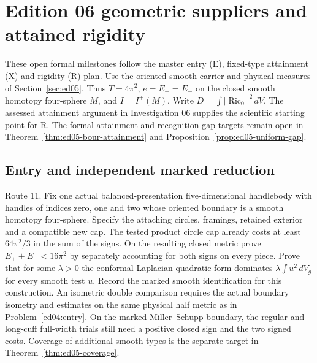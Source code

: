 \section{Edition 06 geometric suppliers and attained rigidity}
\label{sec:ed06}
These open formal milestones follow the master entry (E), fixed-type
attainment (X) and rigidity (R) plan. Use the oriented smooth carrier and
physical measures of Section~\ref{sec:ed05}. Thus $T=4\pi^2$,
$e=E_+=E_-$ on the closed smooth homotopy four-sphere $M$, and
$I=I^+(M)$. Write $D=\int|\operatorname{Ric}_0|^2\,dV$.
The assessed attainment argument in Investigation 06
supplies the scientific starting point for R. The formal attainment
and recognition-gap targets remain open in
Theorem~\ref{thm:ed05-bour-attainment} and
Proposition~\ref{prop:ed05-uniform-gap}.

\subsection{Entry and independent marked reduction}

\begin{openproblem}
\label{prob:ed06-entry-construction}
Route 11. Fix one actual balanced-presentation five-dimensional
handlebody with handles of indices zero, one and two whose oriented
boundary is a smooth homotopy four-sphere. Specify the attaching circles,
framings, retained exterior and a compatible new cap. The tested product
circle cap already costs at least $64\pi^2/3$ in the sum of the signs.
On the resulting closed metric prove $E_++E_-<16\pi^2$ by separately
accounting for both signs on every piece. Prove that for some $\lambda>0$
the conformal-Laplacian quadratic form dominates
$\lambda\int u^2\,dV_g$ for every smooth test $u$. Record the marked
smooth identification for this construction. An isometric
double comparison requires the actual boundary isometry and estimates
on the same physical half metric as in Problem~\ref{ed04:entry}.
On the marked Miller--Schupp boundary, the regular and long-cuff full-width trials still need a positive closed sign and the two signed costs. Coverage of additional smooth types is the separate target
in Theorem~\ref{thm:ed05-coverage}.
\end{openproblem}

